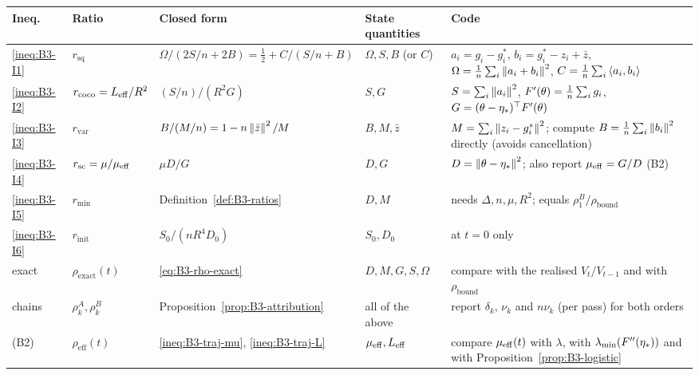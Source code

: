 \begin{center}
\footnotesize
\setlength{\tabcolsep}{4pt}
\begin{tabular}{@{}p{1.2cm}p{2.2cm}p{3.8cm}p{2.3cm}p{5.7cm}@{}}
\toprule
Ineq. & Ratio & Closed form & State quantities & Code \tabularnewline
\midrule
\eqref{ineq:B3-I1} & $r_{\mathrm{sq}}$ & \raggedright $\Omega/(2S/n+2B)=\tfrac12+C/(S/n+B)$ & \raggedright $\Omega,S,B$ (or $C$) & \raggedright $a_i=g_i-g^\ast_i$, $b_i=g^\ast_i-z_i+\bar z$, $\Omega=\frac1n\sum_i\left\|a_i+b_i\right\|^2$, $C=\frac1n\sum_i\left\langle a_i, b_i \right\rangle$ \tabularnewline
\eqref{ineq:B3-I2} & $r_{\mathrm{coco}}=L_{\mathrm{eff}}/R^2$ & \raggedright $(S/n)/(R^2G)$ & \raggedright $S,G$ & \raggedright $S=\sum_i\left\|a_i\right\|^2$, $F'(\theta)=\frac1n\sum_i g_i$, $G=(\theta-\eta_\ast)^\top F'(\theta)$ \tabularnewline
\eqref{ineq:B3-I3} & $r_{\mathrm{var}}$ & \raggedright $B/(M/n)=1-n\left\|\bar z\right\|^2/M$ & \raggedright $B,M,\bar z$ & \raggedright $M=\sum_i\left\|z_i-g^\ast_i\right\|^2$; compute $B=\frac1n\sum_i\left\|b_i\right\|^2$ directly (avoids cancellation) \tabularnewline
\eqref{ineq:B3-I4} & $r_{\mathrm{sc}}=\mu/\mu_{\mathrm{eff}}$ & \raggedright $\mu D/G$ & \raggedright $D,G$ & \raggedright $D=\left\|\theta-\eta_\ast\right\|^2$; also report $\mu_{\mathrm{eff}}=G/D$ (B2) \tabularnewline
\eqref{ineq:B3-I5} & $r_{\min}$ & \raggedright Definition~\ref{def:B3-ratios} & \raggedright $D,M$ & \raggedright needs $\Delta,n,\mu,R^2$; equals $\rho^B_1/\rho_{\mathrm{bound}}$ \tabularnewline
\eqref{ineq:B3-I6} & $r_{\mathrm{init}}$ & \raggedright $S_0/(nR^4D_0)$ & \raggedright $S_0,D_0$ & \raggedright at $t=0$ only \tabularnewline
exact & $\rho_{\mathrm{exact}}(t)$ & \raggedright \eqref{eq:B3-rho-exact} & \raggedright $D,M,G,S,\Omega$ & \raggedright compare with the realised $V_t/V_{t-1}$ and with $\rho_{\mathrm{bound}}$ \tabularnewline
chains & $\rho^A_k,\rho^B_k$ & \raggedright Proposition~\ref{prop:B3-attribution} & \raggedright all of the above & \raggedright report $\delta_k$, $\nu_k$ and $n\nu_k$ (per pass) for both orders \tabularnewline
(B2) & $\rho_{\mathrm{eff}}(t)$ & \raggedright \eqref{ineq:B3-traj-mu}, \eqref{ineq:B3-traj-L} & \raggedright $\mu_{\mathrm{eff}},L_{\mathrm{eff}}$ & \raggedright compare $\mu_{\mathrm{eff}}(t)$ with $\lambda$, with $\lambda_{\min}(F''(\eta_\ast))$ and with Proposition~\ref{prop:B3-logistic} \tabularnewline
\bottomrule
\end{tabular}
\end{center}


